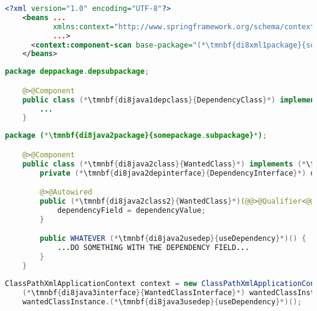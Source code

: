 \begin{lstlisting}[language=XML, title={Configuration XML}]
    <?xml version="1.0" encoding="UTF-8"?>
    <beans ...
           xmlns:context="http://www.springframework.org/schema/context"
           ...>
      <context:component-scan base-package="(*\tmnbf{di8xml1package}{somepackage.subpackage}[ForestGreen]*)"/>
    </beans>
\end{lstlisting}
\begin{lstlisting}[language=Java, title={Dependency class}]
    package deppackage.depsubpackage;

    @>@Component
    public class (*\tmnbf{di8java1depclass}{DependencyClass}*) implements (*\tmnbf{di8java1depinterface}{DependencyInterface}*) {
        ...
    }
\end{lstlisting}
\begin{lstlisting}[language=Java, title={Wanted class with the constructor}]
    package (*\tmnbf{di8java2package}{somepackage.subpackage}*);

    @>@Component
    public class (*\tmnbf{di8java2class}{WantedClass}*) implements (*\tmnbf{di8java2interface}{WantedClassInterface}*) {
        private (*\tmnbf{di8java2depinterface}{DependencyInterface}*) dependencyField;

        @>@Autowired
        public (*\tmnbf{di8java2class2}{WantedClass}*)(@@>@Qualifier<@@("(*\tmnbf{di8java2depbeanid}{dependencyClass}[ForestGreen]*)") (*\tmnbf{di8java2depinterface2}{DependencyInterface}*) dependencyValue) {
            dependencyField = dependencyValue;
        }

        public WHATEVER (*\tmnbf{di8java2usedep}{useDependency}*)() {
            ...DO SOMETHING WITH THE DEPENDENCY FIELD...
        }
    }
\end{lstlisting}
\begin{lstlisting}[language=Java, title={Usage}]
    ClassPathXmlApplicationContext context = new ClassPathXmlApplicationContext("configurationFile.xml");
    (*\tmnbf{di8java3interface}{WantedClassInterface}*) wantedClassInstance = context.getBean("(*\tmnbf{di8java3beanid}{wantedClass}[ForestGreen]*)", (*\tmnbf{di8java3interface2}{WantedClassInterface}*).class);
    wantedClassInstance.(*\tmnbf{di8java3usedep}{useDependency}*)();
\end{lstlisting}
\newpage

